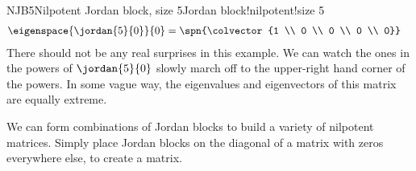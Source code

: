\begin{example}{NJB5}{Nilpotent Jordan block, size 5}{Jordan block!nilpotent!size 5}
%
\begin{align*}
\eigenspace{\jordan{5}{0}}{0}&=
\spn{\colvector{1 \\ 0 \\ 0 \\ 0 \\ 0}}
\end{align*}
%
There should not be any real surprises in this example.  We can watch the ones in the powers of $\jordan{5}{0}$ slowly march off to the upper-right hand corner of the powers.  In some vague way, the eigenvalues and eigenvectors of this matrix are equally extreme.
%
\end{example}
%
We can form combinations of Jordan blocks to build a variety of nilpotent matrices.  Simply place Jordan blocks on the diagonal of a matrix with zeros everywhere else, to create a  matrix.
%
